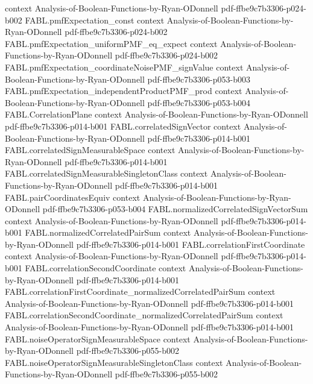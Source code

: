 \begin{theorem}
  {context}
  {Analysis-of-Boolean-Functions-by-Ryan-ODonnell}
  {pdf-ffbe9c7b3306-p024-b002}
\proofstep
  {FABL.pmfExpectation_const}
  {context}
  {Analysis-of-Boolean-Functions-by-Ryan-ODonnell}
  {pdf-ffbe9c7b3306-p024-b002}
\proofstep
  {FABL.pmfExpectation_uniformPMF_eq_expect}
  {context}
  {Analysis-of-Boolean-Functions-by-Ryan-ODonnell}
  {pdf-ffbe9c7b3306-p024-b002}
\proofstep
  {FABL.pmfExpectation_coordinateNoisePMF_signValue}
  {context}
  {Analysis-of-Boolean-Functions-by-Ryan-ODonnell}
  {pdf-ffbe9c7b3306-p053-b003}
\proofstep
  {FABL.pmfExpectation_independentProductPMF_prod}
  {context}
  {Analysis-of-Boolean-Functions-by-Ryan-ODonnell}
  {pdf-ffbe9c7b3306-p053-b004}
\proofstep
  {FABL.CorrelationPlane}
  {context}
  {Analysis-of-Boolean-Functions-by-Ryan-ODonnell}
  {pdf-ffbe9c7b3306-p014-b001}
\proofstep
  {FABL.correlatedSignVector}
  {context}
  {Analysis-of-Boolean-Functions-by-Ryan-ODonnell}
  {pdf-ffbe9c7b3306-p014-b001}
\proofstep
  {FABL.correlatedSignMeasurableSpace}
  {context}
  {Analysis-of-Boolean-Functions-by-Ryan-ODonnell}
  {pdf-ffbe9c7b3306-p014-b001}
\proofstep
  {FABL.correlatedSignMeasurableSingletonClass}
  {context}
  {Analysis-of-Boolean-Functions-by-Ryan-ODonnell}
  {pdf-ffbe9c7b3306-p014-b001}
\proofstep
  {FABL.pairCoordinatesEquiv}
  {context}
  {Analysis-of-Boolean-Functions-by-Ryan-ODonnell}
  {pdf-ffbe9c7b3306-p053-b004}
\proofstep
  {FABL.normalizedCorrelatedSignVectorSum}
  {context}
  {Analysis-of-Boolean-Functions-by-Ryan-ODonnell}
  {pdf-ffbe9c7b3306-p014-b001}
\proofstep
  {FABL.normalizedCorrelatedPairSum}
  {context}
  {Analysis-of-Boolean-Functions-by-Ryan-ODonnell}
  {pdf-ffbe9c7b3306-p014-b001}
\proofstep
  {FABL.correlationFirstCoordinate}
  {context}
  {Analysis-of-Boolean-Functions-by-Ryan-ODonnell}
  {pdf-ffbe9c7b3306-p014-b001}
\proofstep
  {FABL.correlationSecondCoordinate}
  {context}
  {Analysis-of-Boolean-Functions-by-Ryan-ODonnell}
  {pdf-ffbe9c7b3306-p014-b001}
\proofstep
  {FABL.correlationFirstCoordinate_normalizedCorrelatedPairSum}
  {context}
  {Analysis-of-Boolean-Functions-by-Ryan-ODonnell}
  {pdf-ffbe9c7b3306-p014-b001}
\proofstep
  {FABL.correlationSecondCoordinate_normalizedCorrelatedPairSum}
  {context}
  {Analysis-of-Boolean-Functions-by-Ryan-ODonnell}
  {pdf-ffbe9c7b3306-p014-b001}
\proofstep
  {FABL.noiseOperatorSignMeasurableSpace}
  {context}
  {Analysis-of-Boolean-Functions-by-Ryan-ODonnell}
  {pdf-ffbe9c7b3306-p055-b002}
\proofstep
  {FABL.noiseOperatorSignMeasurableSingletonClass}
  {context}
  {Analysis-of-Boolean-Functions-by-Ryan-ODonnell}
  {pdf-ffbe9c7b3306-p055-b002}

\end{theorem}
